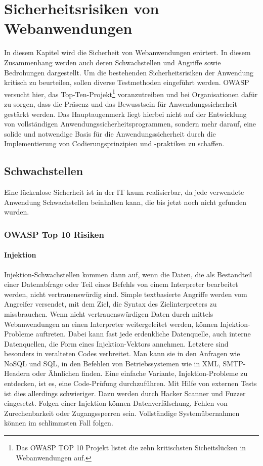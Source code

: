 \chapter{Sicherheitsrisiken von Webanwendungen}
\label{cha:k3}

In diesem Kapitel wird die Sicherheit von Webanwendungen erörtert. In diesem Zusammenhang werden auch deren Schwachstellen und Angriffe sowie Bedrohungen dargestellt. Um die bestehenden Sicherheitsrisiken der Anwendung kritisch zu beurteilen, sollen diverse Testmethoden eingeführt werden. OWASP versucht hier, das Top-Ten-Projekt\footnote{Das OWASP TOP 10 Projekt listet die zehn kritischsten Sicheitslücken in Webanwendungen auf.} voranzutreiben und bei Organisationen dafür zu sorgen, dass die Präsenz und das Bewusstsein für Anwendungssicherheit gestärkt werden. Das Hauptaugenmerk liegt hierbei nicht auf der Entwicklung von vollständigen Anwendungssicherheitsprogrammen, sondern mehr darauf, eine solide und notwendige Basis für die Anwendungssicherheit durch die Implementierung von Codierungsprinzipien und -praktiken zu schaffen.

\section{Schwachstellen}

Eine lückenlose Sicherheit ist in der IT kaum realisierbar, da jede verwendete Anwendung Schwachstellen beinhalten kann, die bis jetzt noch nicht gefunden wurden.

\subsection{OWASP Top 10 Risiken}

\subsubsection{Injektion}

Injektion-Schwachstellen kommen dann auf, wenn die Daten, die als Bestandteil einer Datenabfrage oder Teil eines Befehls von einem Interpreter bearbeitet werden, nicht vertrauenswürdig sind. Simple textbasierte Angriffe werden vom Angreifer versendet, mit dem Ziel, die Syntax des Zielinterpreters zu missbrauchen. Wenn nicht vertrauenswürdigen Daten durch mittels Webanwendungen an einen Interpreter weitergeleitet werden, können Injektion-Probleme auftreten. Dabei kann fast jede erdenkliche Datenquelle, auch interne Datenquellen, die Form eines Injektion-Vektors annehmen. Letztere sind besonders in veralteten Codes verbreitet. Man kann sie in den Anfragen wie NoSQL und SQL, in den Befehlen von Betriebssystemen wie in XML, SMTP-Headern oder Ähnlichen finden. Eine einfache Variante, Injektion-Probleme zu entdecken, ist es, eine Code-Prüfung durchzuführen. Mit Hilfe von externen Tests ist dies allerdings schwieriger. Dazu werden durch Hacker Scanner und Fuzzer eingesetzt. Folgen einer Injektion können Datenverfälschung, Fehlen von Zurechenbarkeit oder Zugangssperren sein. Vollständige Systemübernahmen können im schlimmsten Fall folgen\cite{owasp13top10}.\\

